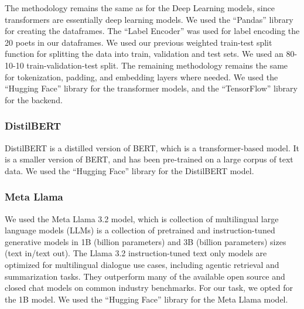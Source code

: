 The methodology remains the same as for the Deep Learning models, since transformers are essentially deep learning models. We used the ``Pandas'' library for creating the dataframes. The ``Label Encoder'' was used for label encoding the 20 poets in our dataframes. We used our previous weighted train-test split function for splitting the data into train, validation and test sets. We used an 80-10-10 train-validation-test split. The remaining methodology remains the same for tokenization, padding, and embedding layers where needed. We used the ``Hugging Face'' library for the transformer models, and the ``TensorFlow'' library for the backend. 




\subsubsection{DistilBERT}
DistilBERT is a distilled version of BERT, which is a transformer-based model. It is a smaller version of BERT, and has been pre-trained on a large corpus of text data. We used the ``Hugging Face'' library for the DistilBERT model. 


\subsubsection{Meta Llama}
We used the Meta Llama 3.2 model, which is collection of multilingual large language models (LLMs) is a collection of pretrained and instruction-tuned generative models in 1B (billion parameters) and 3B (billion parameters) sizes (text in/text out). The Llama 3.2 instruction-tuned text only models are optimized for multilingual dialogue use cases, including agentic retrieval and summarization tasks. They outperform many of the available open source and closed chat models on common industry benchmarks. For our task, we opted for the 1B model. We used the ``Hugging Face'' library for the Meta Llama model. 

